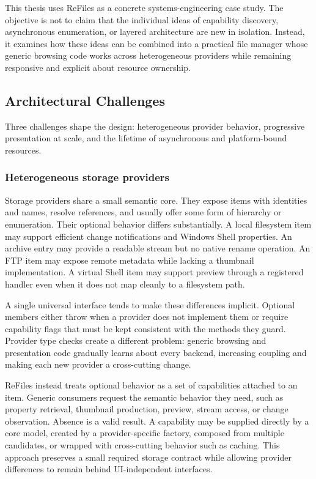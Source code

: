 \documentclass[10pt,a4paper,twoside]{article}
\begin{document}
This thesis uses ReFiles as a concrete systems-engineering case study. The objective is not to claim that the
individual ideas of capability discovery, asynchronous enumeration, or layered architecture are new in
isolation. Instead, it examines how these ideas can be combined into a practical file manager whose generic
browsing code works across heterogeneous providers while remaining responsive and explicit about resource
ownership.

\subsection{Architectural Challenges}

Three challenges shape the design: heterogeneous provider behavior, progressive presentation at scale, and the
lifetime of asynchronous and platform-bound resources.

\subsubsection{Heterogeneous storage providers}

Storage providers share a small semantic core. They expose items with identities and names, resolve references,
and usually offer some form of hierarchy or enumeration. Their optional behavior differs substantially. A local
filesystem item may support efficient change notifications and Windows Shell properties. An archive entry may
provide a readable stream but no native rename operation. An FTP item may expose remote metadata while lacking a
thumbnail implementation. A virtual Shell item may support preview through a registered handler even when it
does not map cleanly to a filesystem path.

A single universal interface tends to make these differences implicit. Optional members either throw when a
provider does not implement them or require capability flags that must be kept consistent with the methods they
guard. Provider type checks create a different problem: generic browsing and presentation code gradually learns
about every backend, increasing coupling and making each new provider a cross-cutting change.

ReFiles instead treats optional behavior as a set of capabilities attached to an item. Generic consumers request
the semantic behavior they need, such as property retrieval, thumbnail production, preview, stream access, or
change observation. Absence is a valid result. A capability may be supplied directly by a core model, created by
a provider-specific factory, composed from multiple candidates, or wrapped with cross-cutting behavior such as
caching. This approach preserves a small required storage contract while allowing provider differences to remain
behind UI-independent interfaces.
\end{document}
